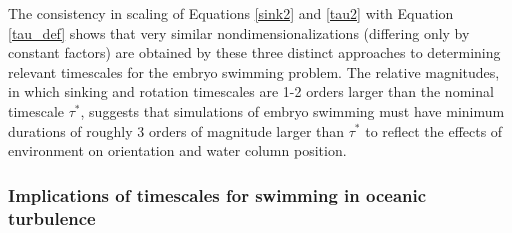 \documentclass[10pt,a4paper]{article}
\begin{document}
The consistency in scaling of Equations \ref{sink2} and \ref{tau2} with Equation \ref{tau_def} shows that very similar nondimensionalizations (differing only by constant factors) are obtained by these three distinct approaches to determining relevant timescales for the embryo swimming problem.
The relative magnitudes, in which sinking and rotation timescales are 1-2 orders larger than the nominal timescale $\tau^*$, suggests that simulations of embryo swimming must have minimum durations of roughly 3 orders of magnitude larger than $\tau^*$ to reflect the effects of environment on orientation and water column position.

\subsubsection{Implications of timescales for swimming in oceanic turbulence}\label{turb}
\end{document}
